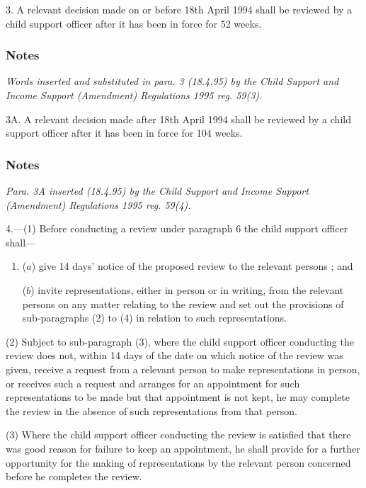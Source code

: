 \documentclass[a4paper]{article}
\newcommand\amendment[1]{\subsubsection*{Notes}{\itshape\frenchspacing\footnotesize #1 \par\goodbreak}}
\begin{document}
\medskip

3.  A relevant decision 
made on or before 18th April 1994  %
shall be reviewed by a child support officer 
after  %
it has been in force for 52 weeks.

\amendment{
Words inserted and substituted in para. 3 (18.4.95) by the Child Support and Income Support (Amendment) Regulations 1995 reg. 59(3).
}

\medskip

3A.  A relevant decision made after 18th April 1994 shall be reviewed by a child support officer after it has been in force for 104 weeks.

\amendment{
Para. 3A inserted (18.4.95) by the Child Support and Income Support (Amendment) Regulations 1995 reg. 59(4).
}

\medskip

4.—(1) Before conducting a review under paragraph 6 the child support officer shall---
\begin{enumerate}\item[]
($a$) give 14 days' notice of the proposed review to the relevant persons%
; and

($b$) invite representations, either in person or in writing, from the relevant persons on any matter relating to the review and set out the provisions of sub-paragraphs (2) to (4) in relation to such representations.
\end{enumerate}

(2) Subject to sub-paragraph (3), where the child support officer conducting the review does not, within 14 days of the date on which notice of the review was given, receive a request from a relevant person to make representations in person, or receives such a request and arranges for an appointment for such representations to be made but that appointment is not kept, he may complete the review in the absence of such representations from that person.

(3) Where the child support officer conducting the review is satisfied that there was good reason for failure to keep an appointment, he shall provide for a further opportunity for the making of representations by the relevant person concerned before he completes the review.
\end{document}
